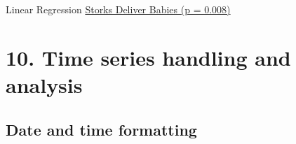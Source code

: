 \documentclass[xcolor=table,       handout,    xcolor=dvipsnames]{beamer}\usepackage[]{graphicx}\usepackage[]{color}
\begin{document}

\begin{frame}[fragile]{Linear Regression}
\href{http://www.econ.queensu.ca/files/other/storks.pdf}{Storks Deliver Babies (p = 0.008)}
\end{frame}

\section{10. Time series handling and analysis}

\subsection{Date and time formatting}
\end{document}
